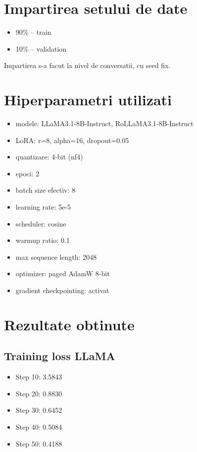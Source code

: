 \documentclass{article}
\begin{document}
\section{Impartirea setului de date}

\begin{itemize}
    \item 90\% -- train
    \item 10\% -- validation
\end{itemize}

Impartirea s-a facut la nivel de conversatii, cu seed fix.


\section{Hiperparametri utilizati}

\begin{itemize}
    \item modele: LLaMA3.1-8B-Instruct, RoLLaMA3.1-8B-Instruct
    \item LoRA: r=8, alpha=16, dropout=0.05
    \item quantizare: 4-bit (nf4)
    \item epoci: 2
    \item batch size efectiv: 8
    \item learning rate: 5e-5
    \item scheduler: cosine
    \item warmup ratio: 0.1
    \item max sequence length: 2048
    \item optimizer: paged AdamW 8-bit
    \item gradient checkpointing: activat
\end{itemize}


\section{Rezultate obtinute}

\subsection{Training loss LLaMA}
\begin{itemize}
    \item Step 10: 3.5843
    \item Step 20: 0.8830
    \item Step 30: 0.6452
    \item Step 40: 0.5084
    \item Step 50: 0.4188
\end{itemize}
\end{document}
